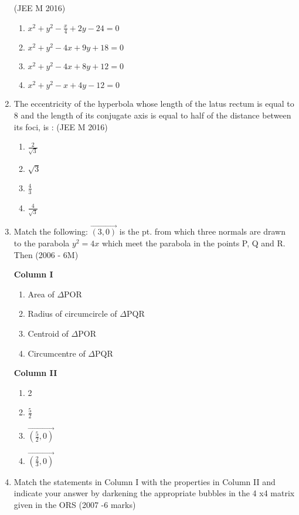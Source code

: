 \begin{enumerate}
\hfill(JEE M 2016)
\begin{enumerate}
    \item $x^2+y^2-\frac{x}{4}+2y-24=0$ 
    \item $x^2+y^2-4x+9y+18=0$ 
    \item $x^2+y^2-4x+8y+12=0$
    \item $x^2+y^2-x+4y-12=0$
\end{enumerate}
\item The eccentricity of the hyperbola whose length of the latus rectum is equal to $8$ and the length of its conjugate axis is equal to half of the distance between its foci, is : 
\hfill(JEE M 2016)
\begin{enumerate}
    \item $\frac{2}{\sqrt{3}}$
    \item $\sqrt{3}$
    \item $\frac{4}{3}$
    \item $\frac{4}{\sqrt{3}}$
\end{enumerate}
	\item   Match the following: $\vec{(3,0)}$ is the pt. from which three normals are drawn to the parabola $y^2 = 4x$ which meet the parabola in the points P, Q and R. Then \hfill{(2006 - 6M)}
\begin{multicols}{2}
\textbf{Column I}
\begin{enumerate}
    \item Area of $\Delta$POR 
    \item Radius of circumcircle of $\Delta$PQR
    \item Centroid of $\Delta$POR 
    \item  Circumcentre of $\Delta$PQR 
\end{enumerate} 

\textbf{Column II}
\begin{enumerate}
    \item 2
    \item $\frac{5}{2}$
    \item $\vec{(\frac{5}{2},0)}$
    \item $\vec{(\frac{2}{3},0)}$
\end{enumerate}
\end{multicols}

\item Match the statements in Column I with the properties in Column II and indicate your answer by darkening the appropriate bubbles in the 4 x4 matrix given in the ORS  \hfill{(2007 -6 marks)}


\end{enumerate}
